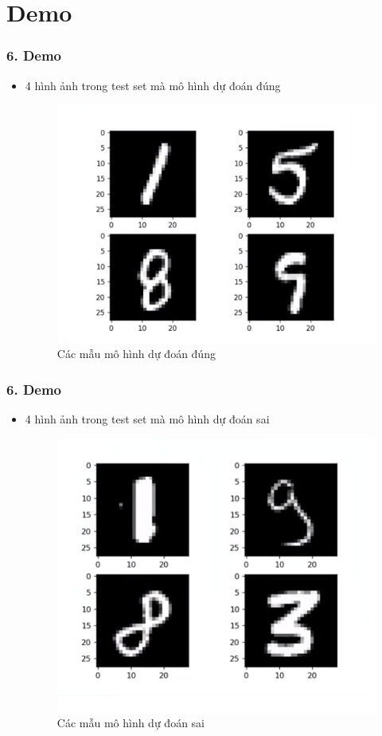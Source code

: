 \documentclass{beamer}
\begin{document}
\section{Demo} 

\begin{frame}
\frametitle{6. Demo}
\begin{itemize}
    \item 4 hình ảnh trong test set mà mô hình dự đoán đúng
    \begin{figure}[H]
    \centering
    \includegraphics[width=0.75\linewidth]{images/true.png}
    \caption{Các mẫu mô hình dự đoán đúng}
        
    \end{figure}
    
\end{itemize}
\end{frame}

\begin{frame}
\frametitle{6. Demo}
\begin{itemize}
\item 4 hình ảnh trong test set mà mô hình dự đoán sai
    \begin{figure}[H]
    \centering
    \includegraphics[width=0.75\linewidth]{images/false.png}
    \caption{Các mẫu mô hình dự đoán sai}
\end{figure}
\end{itemize}
\end{frame}
\end{document}
